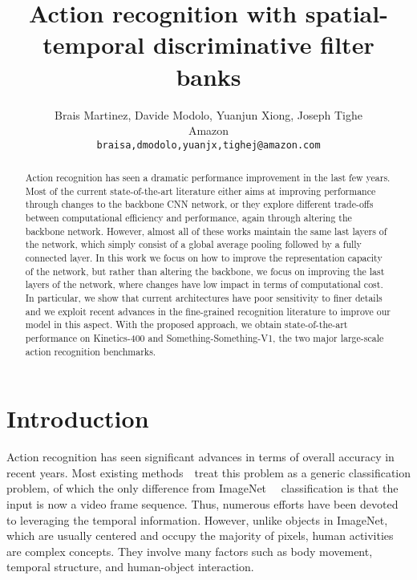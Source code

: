 \documentclass[10pt,twocolumn,letterpaper]{article}
\begin{document}
\title{Action recognition with spatial-temporal discriminative filter banks}

\author{Brais Martinez, Davide Modolo, Yuanjun Xiong, Joseph Tighe\\
Amazon\\
{\tt\small braisa,dmodolo,yuanjx,tighej@amazon.com}
}

\maketitle


\begin{abstract}
Action recognition has seen a dramatic performance improvement in the last few years. Most of the current state-of-the-art literature either aims at improving performance through changes to the backbone CNN network, or they explore different trade-offs between computational efficiency and performance, again through altering the backbone network. However, almost all of these works maintain the same last layers of the network, which simply consist of a global average pooling followed by a fully connected layer. In this work we focus on how to improve the representation capacity of the network, but rather than altering the backbone, we focus on improving the last layers of the network, where changes have low impact in terms of computational cost. In particular, we show that current architectures have poor sensitivity to finer details and we exploit recent advances in the fine-grained recognition literature to improve our model in this aspect. With the proposed approach, we obtain state-of-the-art performance on Kinetics-400 and Something-Something-V1, the two major large-scale action recognition benchmarks. 
\end{abstract}


\section{Introduction}
\label{sec:intro}


Action recognition has seen significant advances in terms of overall accuracy in recent years.
Most existing methods~\cite{Inflated3D_CVPR17,threeD_TPAMI13,TSN_TPAMI18,NonLocalNN_CVPR18,S3D_G_ECCV18}~treat this problem as a generic classification problem, of which the only difference from ImageNet~\cite{ImageNet_CVPR09}~ classification is that the input is now a video frame sequence. 
Thus, numerous efforts have been devoted to leveraging the temporal information.
However, unlike objects in ImageNet, which are usually centered and occupy the majority of pixels, human activities are complex concepts. They involve many factors such as body movement, temporal structure, and human-object interaction. 
\end{document}
